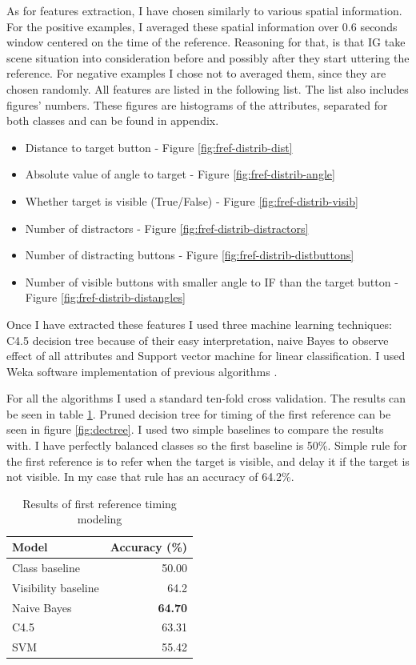 As for features extraction, I have chosen similarly to \citet{stoia2006sentence} various spatial information. For the positive examples, I averaged these spatial information over 0.6 seconds window centered on the time of the reference. Reasoning for that, is that IG take scene situation into consideration before and possibly after they start uttering the reference. For negative examples I chose not to averaged them, since they are chosen randomly. All features are listed in the following list. The list also includes figures' numbers. These figures are histograms of the attributes, separated for both classes and can be found in appendix.

\begin{itemize}
\item
Distance to target button - Figure \ref{fig:fref-distrib-dist}
\item
Absolute value of angle to target - Figure \ref{fig:fref-distrib-angle}
\item
Whether target is visible (True/False) - Figure \ref{fig:fref-distrib-visib}
\item
Number of distractors - Figure \ref{fig:fref-distrib-distractors}
\item
Number of distracting buttons - Figure \ref{fig:fref-distrib-distbuttons}
\item
Number of visible buttons with smaller angle to IF than the target button - Figure \ref{fig:fref-distrib-distangles}
\end{itemize}

Once I have extracted these features I used three machine learning techniques: C4.5 decision tree because of their easy interpretation, naive Bayes to observe effect of all attributes and Support vector machine for linear classification. I used Weka software implementation of previous algorithms \citep{hall2009weka}.

For all the algorithms I used a standard ten-fold cross validation. The results can be seen in table \ref{tab:firstref}. Pruned decision tree for timing of the first reference can be seen in figure \ref{fig:dectree}. I used two simple baselines to compare the results with. I have perfectly balanced classes so the first baseline is 50\%. Simple rule for the first reference is to refer when the target is visible, and delay it if the target is not visible. In my case that rule has an accuracy of 64.2\%. 

\begin{table}[!htbp]
 \centering
\begin{tabular}{lr}
\toprule
Model    & Accuracy (\%)  \\
\midrule
Class baseline    & 50.00\\
Visibility baseline & 64.2\\
\midrule
Naive Bayes  & \textbf{64.70} \\
C4.5 & 63.31 \\
SVM & 55.42 \\
\bottomrule
\end{tabular}
\caption{Results of first reference timing modeling}
\label{tab:firstref}
\end{table}

